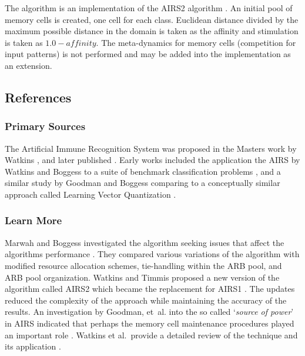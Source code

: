 The algorithm is an implementation of the AIRS2 algorithm \cite{Watkins2002b}. An initial pool of memory cells is created, one cell for each class. Euclidean distance divided by the maximum possible distance in the domain is taken as the affinity and stimulation is taken as $1.0-affinity$. The meta-dynamics for memory cells (competition for input patterns) is not performed and may be added into the implementation as an extension.



\subsection{References}

% 
% 
\subsubsection{Primary Sources}
The Artificial Immune Recognition System was proposed in the Masters work by Watkins \cite{Watkins2001}, and later published \cite{Watkins2002a}.
Early works included the application the AIRS by Watkins and Boggess to a suite of benchmark classification problems \cite{Watkins2002}, and a similar study by Goodman and Boggess comparing to a conceptually similar approach called Learning Vector Quantization \cite{Goodman2002}.

% 
% 
\subsubsection{Learn More}
Marwah and Boggess investigated the algorithm seeking issues that affect the algorithms performance \cite{Marwah2002}. They compared various variations of the algorithm with modified resource allocation schemes, tie-handling within the ARB pool, and ARB pool organization.
Watkins and Timmis proposed a new version of the algorithm called AIRS2 which became the replacement for AIRS1 \cite{Watkins2002b}. The updates reduced the complexity of the approach while maintaining the accuracy of the results. An investigation by Goodman, et~al. into the so called `\emph{source of power}' in AIRS indicated that perhaps the memory cell maintenance procedures played an important role \cite{Goodman2003}.
Watkins et al.\ provide a detailed review of the technique and its application \cite{Watkins2004a}.


